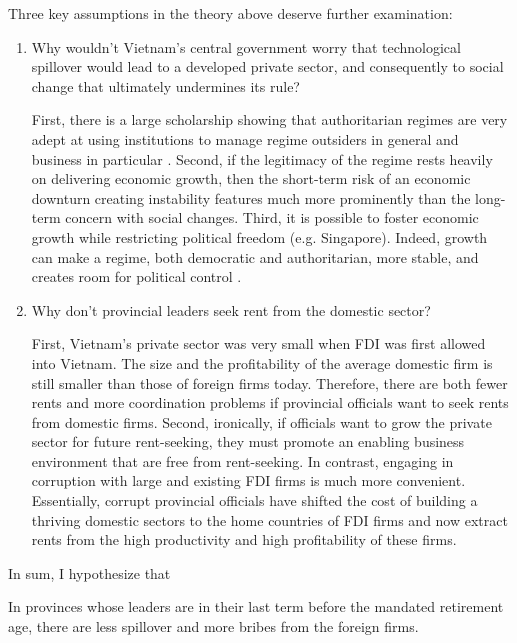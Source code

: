 Three key assumptions in the theory above deserve further examination:
\begin{enumerate}
\item Why wouldn't Vietnam's central government worry that technological spillover would lead to a developed private sector, and consequently to social change that ultimately undermines its rule?

First, there is a large scholarship showing that authoritarian regimes are very adept at using institutions to manage regime outsiders in general and business in particular \citep{Gandhi2006, Gandhi2008, Wright2008, Le2015}. Second, if the legitimacy of the regime rests heavily on delivering economic growth, then the short-term risk of an economic downturn creating instability features much more prominently than the long-term concern with social changes. Third, it is possible to foster economic growth while restricting political freedom (e.g. Singapore). Indeed, growth can make a regime, both democratic and authoritarian, more stable, and creates room for political control \citep{Przeworski1997}.

\item Why don't provincial leaders seek rent from the domestic sector? 

First, Vietnam's private sector was very small when FDI was first allowed into Vietnam. The size and the profitability of the average domestic firm is still smaller than those of foreign firms today. Therefore, there are both fewer rents and more coordination problems if provincial officials want to seek rents from domestic firms. Second, ironically, if officials want to grow the private sector for future rent-seeking, they must promote an enabling business environment that are free from rent-seeking. In contrast, engaging in corruption with large and existing FDI firms is much more convenient. Essentially, corrupt provincial officials have shifted the cost of building a thriving domestic sectors to the home countries of FDI firms and now extract rents from the high productivity and high profitability of these firms. 
\end{enumerate}

In sum, I hypothesize that

\begin{hyp}
In provinces whose leaders are in their last term before the mandated retirement age, there are less spillover and more bribes from the foreign firms.
\end{hyp}


